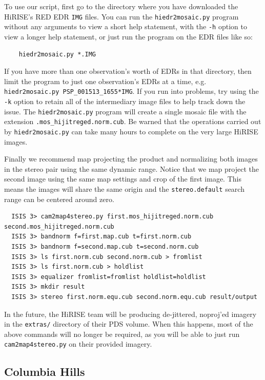 To use our script, first go to the directory where you have downloaded
the HiRISE's RED EDR \texttt{IMG} files. You can run the 
\texttt{hiedr2mosaic.py} program without any arguments to view a short
help statement, with the \texttt{-h} option to view a longer help statement,
or just run the program on the EDR files like so:

\begin{verbatim}
    hiedr2mosaic.py *.IMG
\end{verbatim}

If you have more than one observation's worth of EDRs in that
directory, then limit the program to just one observation's EDRs
at a time, e.g. \texttt{hiedr2mosaic.py PSP\_001513\_1655*IMG}.  If you
run into problems, try using the \texttt{-k} option to retain all of 
the intermediary image files to help track down the issue.  The
\texttt{hiedr2mosaic.py} program will create a single mosaic file 
with the extension \texttt{.mos\_hijitreged.norm.cub}.  Be warned that
the operations carried out by \texttt{hiedr2mosaic.py} can take many 
hours to complete on the very large HiRISE images.

Finally we recommend map projecting the product and normalizing both
images in the stereo pair using the same dynamic range. Notice that we
map project the second image using the same map settings and crop of
the first image. This means the images will share the same origin and
the {\tt stereo.default} search range can be centered around zero.

\begin{verbatim}
  ISIS 3> cam2map4stereo.py first.mos_hijitreged.norm.cub second.mos_hijitreged.norm.cub 
  ISIS 3> bandnorm f=first.map.cub t=first.norm.cub
  ISIS 3> bandnorm f=second.map.cub t=second.norm.cub
  ISIS 3> ls first.norm.cub second.norm.cub > fromlist
  ISIS 3> ls first.norm.cub > holdlist
  ISIS 3> equalizer fromlist=fromlist holdlist=holdlist
  ISIS 3> mkdir result
  ISIS 3> stereo first.norm.equ.cub second.norm.equ.cub result/output
\end{verbatim}

In the future, the HiRISE team will be producing de-jittered, noproj'ed
imagery in the \texttt{extras/} directory of their \ac{PDS} volume.
When this happens, most of the above commands will no longer be required,
as you will be able to just run \texttt{cam2map4stereo.py} on their provided imagery.

\subsection{Columbia Hills}

